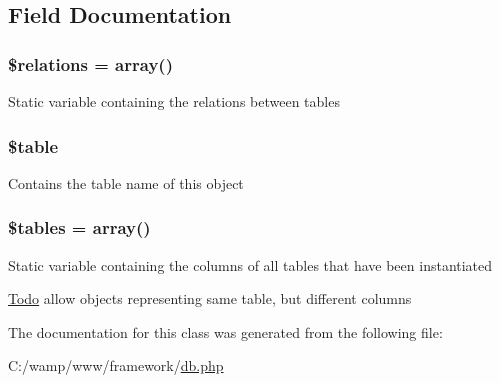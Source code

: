 \subsection{Field Documentation}
\hypertarget{classtable_a5787b67dccb801e89f4ff779d42edece}{
\subsubsection[{\$relations}]{\setlength{\rightskip}{0pt plus 5cm}\$relations = array()}}
\label{classtable_a5787b67dccb801e89f4ff779d42edece}
Static variable containing the relations between tables \hypertarget{classtable_ae8876a14058f368335baccf35af4a22b}{
\subsubsection[{\$table}]{\setlength{\rightskip}{0pt plus 5cm}\${\bf table}}}
\label{classtable_ae8876a14058f368335baccf35af4a22b}
Contains the table name of this object \hypertarget{classtable_a3d332a3c374a53802495dcb045f6133f}{
\subsubsection[{\$tables}]{\setlength{\rightskip}{0pt plus 5cm}\$tables = array()}}
\label{classtable_a3d332a3c374a53802495dcb045f6133f}
Static variable containing the columns of all tables that have been instantiated \begin{Desc}
\item[\hyperlink{todo__todo000005}{Todo}]allow objects representing same table, but different columns \end{Desc}


The documentation for this class was generated from the following file:\begin{DoxyCompactItemize}
\item 
C:/wamp/www/framework/\hyperlink{db_8php}{db.php}\end{DoxyCompactItemize}
